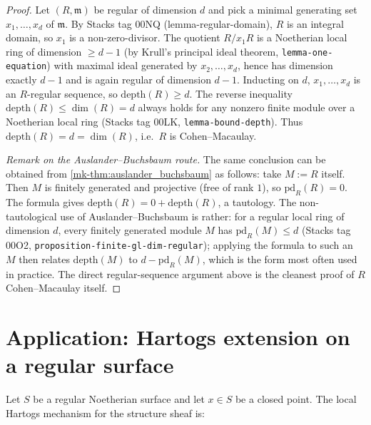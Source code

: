 \begin{proof}
  \leanok


Let \((R, \mathfrak{m})\) be regular of dimension \(d\) and pick a minimal generating set
  \(x_1, \dots, x_d\) of \(\mathfrak{m}\). By Stacks tag 00NQ (lemma-regular-domain), \(R\) is
  an integral domain, so \(x_1\) is a non-zero-divisor. The quotient \(R/x_1 R\) is a Noetherian
  local ring of dimension \(\geq d - 1\) (by Krull's principal ideal theorem,
  \texttt{lemma-one-equation}) with maximal ideal generated by \(x_2, \dots, x_d\), hence
  has dimension exactly \(d - 1\) and is again regular of dimension \(d - 1\). Inducting on \(d\),
  \(x_1, \dots, x_d\) is an \(R\)-regular sequence, so
  \(\text{depth}(R) \geq d\). The reverse inequality \(\text{depth}(R) \leq \dim(R) = d\)
  always holds for any nonzero finite module over a Noetherian local ring
  (Stacks tag 00LK, \texttt{lemma-bound-depth}). Thus \(\text{depth}(R) = d = \dim(R)\), i.e.\
  \(R\) is Cohen--Macaulay.

  \emph{Remark on the Auslander--Buchsbaum route.} The same conclusion can be obtained from
  \ref{mk-thm:auslander_buchsbaum} as follows: take \(M := R\) itself. Then \(M\) is
  finitely generated and projective (free of rank \(1\)), so \(\text{pd}_R(R) = 0\). The
  formula gives \(\text{depth}(R) = 0 + \text{depth}(R)\), a tautology. The non-tautological
  use of Auslander--Buchsbaum is rather: for a regular local ring of dimension \(d\), every
  finitely generated module \(M\) has \(\text{pd}_R(M) \leq d\) (Stacks tag 00O2,
  \texttt{proposition-finite-gl-dim-regular}); applying the formula to such an \(M\) then
  relates \(\text{depth}(M)\) to \(d - \text{pd}_R(M)\), which is the form most often used in
  practice. The direct regular-sequence argument above is the cleanest proof of
  \(R\) Cohen--Macaulay itself.
\end{proof}

\section{Application: Hartogs extension on a regular surface}
\label{mk-sec:ab_application_to_a4a}

Let \(S\) be a regular Noetherian surface and let \(x \in S\) be a closed point.  The local
Hartogs mechanism for the structure sheaf is:


